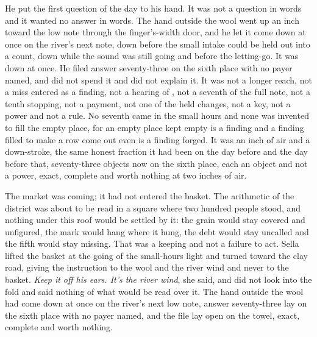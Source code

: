 He put the first question of the day to his hand. It was not a question in words and it wanted no answer in words. The hand outside the wool went up an inch toward the low note through the finger's-width door, and he let it come down at once on the river's next note, down before the small intake could be held out into a count, down while the sound was still going and before the letting-go. It was down at once. He filed answer seventy-three on the sixth place with no payer named, and did not spend it and did not explain it. It was not a longer reach, not a miss entered as a finding, not a hearing of , not a seventh of the full note, not a tenth stopping, not a payment, not one of the held changes, not a key, not a power and not a rule. No seventh came in the small hours and none was invented to fill the empty place, for an empty place kept empty is a finding and a finding filled to make a row come out even is a finding forged. It was an inch of air and a down-stroke, the same honest fraction it had been on the day before and the day before that, seventy-three objects now on the sixth place, each an object and not a power, exact, complete and worth nothing at two inches of air.

The market was coming; it had not entered the basket. The arithmetic of the district was about to be read in a square where two hundred people stood, and nothing under this roof would be settled by it: the grain would stay covered and unfigured, the mark would hang where it hung, the debt would stay uncalled and the fifth would stay missing. That was a keeping and not a failure to act. Sella lifted the basket at the going of the small-hours light and turned toward the clay road, giving the instruction to the wool and the river wind and never to the basket. \emph{Keep it off his ears. It's the river wind}, she said, and did not look into the fold and said nothing of what would be read over it. The hand outside the wool had come down at once on the river's next low note, answer seventy-three lay on the sixth place with no payer named, and the file lay open on the towel, exact, complete and worth nothing.
